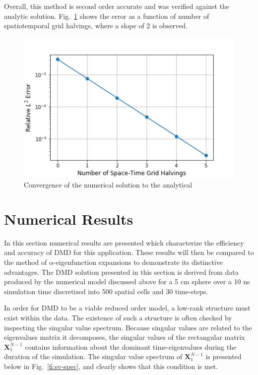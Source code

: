 \documentclass[12pt]{article}
\newcommand{\LFI}[1]{\label{fi:#1}}
\newcommand{\FI}[1]{Fig.~\ref{fi:#1}}
\newcommand{\bfg}{\begin{figure}}
\newcommand{\efg}{\end{figure}}
\begin{document}
Overall, this method is second order accurate and was verified against the analytic solution. 
\FI{2ord} shows the error as a function of number of spatiotemporal grid halvings, where a slope of 2 is observed.

\bfg[h] \centering
	\includegraphics[scale=0.5]{method_convergence.png}
	\caption{Convergence of the numerical solution to the analytical}
	\LFI{2ord}
\efg

\section{Numerical Results}
In this section numerical results are presented which characterize the efficiency and accuracy of DMD for this application.
These results will then be compared to the method of $\alpha$-eigenfunction expansions to demonstrate its distinctive advantages.
The DMD solution presented in this section is derived from data produced by the numerical model discussed above for a 5 cm sphere
over a 10 ns simulation time discretized into 500 spatial cells and 30 time-steps. 

In order for DMD to be a viable reduced order model, a low-rank structure must exist within the data.
The existence of such a structure is often checked by inspecting the singular value spectrum.
Because singular values are related to the eigenvalues matrix it decomposes, the singular values of the rectangular matrix
 $\bm{X}^{N-1}_1$ contains information about the dominant time-eigenvalues during the duration of the simulation.
The singular value spectrum of  $\bm{X}^{N-1}_1$ is presented below in \FI{sv-spec}, and clearly shows that this condition is met.
\end{document}

